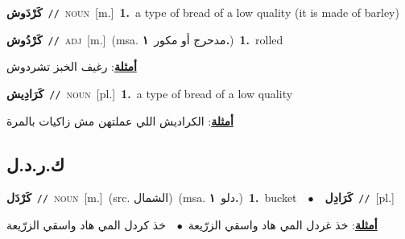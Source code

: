 \documentclass[10pt,a4paper,twoside]{article} %
\begin{document}
\begin{multicols}{2}
{\setlength\topsep{0pt}\textbf{\foreignlanguage{arabic}{كَرْدَوش}}\ {\color{gray}\texttt{//}\color{black}}\ \textsc{noun}\ [m.]\ \textbf{1.}~a type of bread of a low quality (it is made of barley)\ } \vspace{2mm}

{\setlength\topsep{0pt}\textbf{\foreignlanguage{arabic}{كَرْدُوش}}\ {\color{gray}\texttt{//}\color{black}}\ \textsc{adj}\ [m.]\ \color{gray}(msa. \foreignlanguage{arabic}{مدحرج أو مكور}~\foreignlanguage{arabic}{\textbf{١.}})\color{black}\ \textbf{1.}~rolled\  \begin{flushright}\color{gray}\foreignlanguage{arabic}{\textbf{\underline{\foreignlanguage{arabic}{أمثلة}}}: رغيف الخبز تشردوش}\end{flushright}\color{black}} \vspace{2mm}

{\setlength\topsep{0pt}\textbf{\foreignlanguage{arabic}{كَرَادِيش}}\ {\color{gray}\texttt{//}\color{black}}\ \textsc{noun}\ [pl.]\ \textbf{1.}~a type of bread of a low quality\  \begin{flushright}\color{gray}\foreignlanguage{arabic}{\textbf{\underline{\foreignlanguage{arabic}{أمثلة}}}: الكراديش اللي عملتهن مش زاكيات بالمرة}\end{flushright}\color{black}} \vspace{2mm}

\vspace{-3mm}
\subsection*{\color{blue}\foreignlanguage{arabic}{ك.ر.د.ل}\color{blue}{}} 

{\setlength\topsep{0pt}\textbf{\foreignlanguage{arabic}{كَرْدَل}}\ {\color{gray}\texttt{//}\color{black}}\ \textsc{noun}\ [m.]\ (src. \color{gray}\foreignlanguage{arabic}{الشمال}\color{black})\ \color{gray}(msa. \foreignlanguage{arabic}{دلو}~\foreignlanguage{arabic}{\textbf{١.}})\color{black}\ \textbf{1.}~bucket\ \ $\bullet$\ \ \setlength\topsep{0pt}\textbf{\foreignlanguage{arabic}{كَرَادِل}}\ {\color{gray}\texttt{//}\color{black}}\ [pl.]\  \begin{flushright}\color{gray}\foreignlanguage{arabic}{\textbf{\underline{\foreignlanguage{arabic}{أمثلة}}}: خذ غردل المي هاد واسقي الزرّيعة\ $\bullet$\ \  خذ كردل المي هاد واسقي الزرّيعة}\end{flushright}\color{black}} \vspace{2mm}


\end{multicols}
\end{document}
